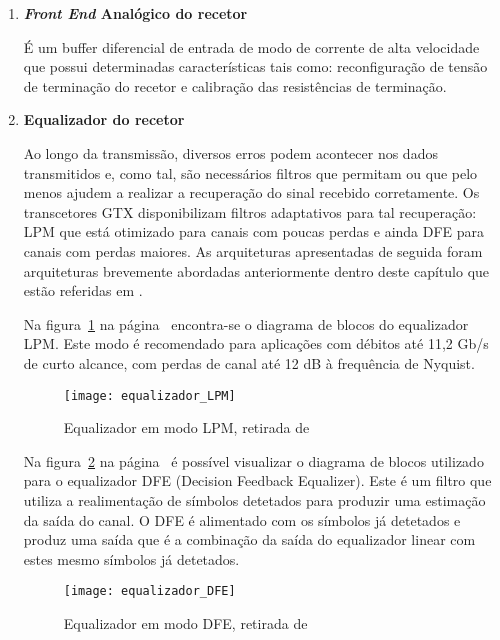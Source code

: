 \begin{enumerate}
	\item \textbf{\textit{Front End} Analógico do recetor}
	
	\hspace{1.0em}É um buffer diferencial de entrada de modo de corrente de alta velocidade que possui determinadas características tais como: reconfiguração de tensão de terminação do recetor e calibração das resistências de terminação.
	
	\item \textbf{Equalizador do recetor}
	
	\hspace{1.0em}Ao longo da transmissão, diversos erros podem acontecer nos dados transmitidos e, como tal, são necessários filtros que permitam ou que pelo menos ajudem a realizar a recuperação do sinal recebido corretamente. Os transcetores GTX disponibilizam filtros adaptativos para tal recuperação: LPM que está otimizado para canais com poucas perdas e ainda DFE para canais com perdas maiores. As arquiteturas apresentadas de seguida foram arquiteturas brevemente abordadas anteriormente dentro deste capítulo que estão referidas em \cite{R012}.
	
	\hspace{1.0em}Na figura~\ref{fig:eq_LPM} na página~\pageref{fig:eq_LPM} encontra-se o diagrama de blocos do equalizador LPM. Este modo é recomendado para aplicações com débitos até 11,2 Gb/s de curto alcance, com perdas de canal até 12 dB à frequência de Nyquist.
	
	\begin{figure}[h!]
		\begin{center}
			\leavevmode
			\texttt{[image: equalizador\_LPM]}
			\caption{Equalizador em modo LPM, retirada de \cite{R011}}
			\label{fig:eq_LPM}
		\end{center}
	\end{figure}

	\hspace{1.0em}Na figura~\ref{fig:eq_DFE} na página~\pageref{fig:eq_DFE} é possível visualizar o diagrama de blocos utilizado para o equalizador DFE (Decision Feedback Equalizer). Este é um filtro que utiliza a realimentação de símbolos detetados para produzir uma estimação da saída do canal. O DFE é alimentado com os símbolos já detetados e produz uma saída que é a combinação da saída do equalizador linear com estes mesmo símbolos já detetados.  

	\begin{figure}[h!]
	\begin{center}
		\leavevmode
		\texttt{[image: equalizador\_DFE]}
		\caption{Equalizador em modo DFE, retirada de \cite{R011}}
		\label{fig:eq_DFE}
	\end{center}
	\end{figure}	


\end{enumerate}

